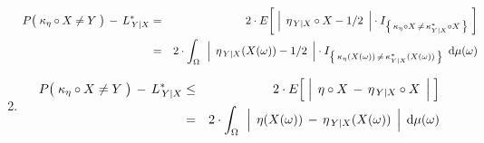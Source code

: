 \begin{theorem}
\begin{enumerate}
\begin{eqnarray*}
	P\!\left(\;\kappa_{\eta} \overset{{\color{white}.}}{\circ} X \neq Y \;\right) \,-\, L^{*}_{\,Y \vert X}
	& = &
		2 \cdot E\!\left[\;
			\left\vert\;\, \eta_{\,Y\vert X} \circ X \overset{{\color{white}.}}{-} 1/2 \;\,\right\vert
			\cdot
			I_{\left\{\,\kappa_{\eta} \circ X \,\neq\, \kappa^{*}_{Y \vert X} \circ X\,\right\}}
			\;\right]
	\\
	& = &
		2 \cdot \int_{\Omega}\,\;
			\left\vert\;\, \eta_{\,Y\vert X}(X(\omega)) \overset{{\color{white}.}}{-} 1/2 \;\,\right\vert
			\cdot
			I_{\left\{\,\kappa_{\eta}(X(\omega)) \,\neq\, \kappa^{*}_{Y \vert X}(X(\omega))\,\right\}}
			\,\;\d\mu(\omega)
	\end{eqnarray*}
\item
	\begin{eqnarray*}
	P\!\left(\;\kappa_{\eta} \overset{{\color{white}.}}{\circ} X \neq Y \;\right) \,-\, L^{*}_{\,Y \vert X}
	& \leq &
		2 \cdot E\!\left[\;
			\left\vert\;\, \eta \circ X \,\overset{{\color{white}.}}{-}\, \eta_{\,Y\vert X} \circ X \;\,\right\vert
			\;\right]
	\\
	& = &
		2 \cdot \int_{\Omega}\,\;
			\left\vert\;\, \eta(X(\omega)) \,\overset{{\color{white}.}}{-}\, \eta_{\,Y\vert X}(X(\omega)) \;\,\right\vert
			\;\d\mu(\omega)
	\end{eqnarray*}
\end{enumerate}
\end{theorem}
\proof

